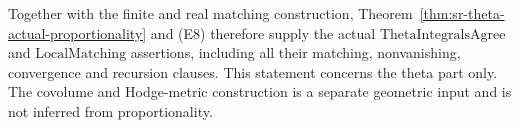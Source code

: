 Together with the finite and real matching construction,
Theorem~\ref{thm:sr-theta-actual-proportionality} and
(E8) therefore supply the actual \(\mathrm{ThetaIntegralsAgree}\)
and \(\mathrm{LocalMatching}\) assertions, including all their
matching, nonvanishing, convergence and recursion clauses.
This statement concerns the theta part only. The
covolume and Hodge-metric construction is a separate
geometric input and is not inferred from proportionality.
